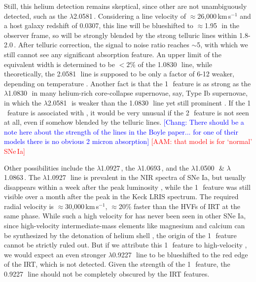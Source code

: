 \documentclass[twocolumn]{aastex631}
\newcommand{\adam}[1]{\textcolor{red}{[AAM: #1]}}
\newcommand{\chang}[1]{\textcolor{blue}{[Chang: #1]}}
\begin{document}
Still, this helium detection remains skeptical, since other  are not unambiguously detected, such as the  $\lambda$2.0581\,\micron. Considering a line velocity of $\approx$26,000\,km\,s$^{-1}$ and a host galaxy redshift of 0.0307, this line will be blueshifted to $\approx$1.95\,\micron\ in the observer frame, so will be strongly blended by the strong telluric lines within 1.8-2.0\,\micron. After telluric correction, the signal to noise ratio reaches $\sim$5, with which we still cannot see any significant absorption feature. An upper limit of the equivalent width is determined to be $<2\%$ of the 1.0830\,\micron\ line, while theoretically, the 2.0581\,\micron\ line is supposed to be only a factor of 6-12 weaker, depending on temperature \citep{Marion2009_NIR}. Another fact is that the 1\,\micron\ feature is as strong as the  $\lambda$1.0830\,\micron\ in many helium-rich core-collapse supernovae, say, Type Ib supernovae, in which the  $\lambda$2.0581\,\micron\ is weaker than the 1.0830\,\micron\ line yet still prominent \citep{CSP_Ibc_2022}. If the 1\,\micron\ feature is associated with , it would be very unusual if the 2\,\micron\ feature is not seen at all, even if somehow blended by the telluric lines. \chang{There should be a note here about the strength of the lines in the Boyle paper... for one of their models there is no obvious 2 micron absorption} \adam{that model is for `normal' SNe\,Ia}

Other possibilities include the  $\lambda$1.0927\,\micron, the  $\lambda$1.0693\,\micron, and the  $\lambda$1.0500\,\micron\ \& $\lambda$1.0863\,\micron. The  $\lambda$1.0927\,\micron\ line is prevalent in the NIR spectra of SNe Ia, but usually disappears within a week after the peak luminosity \citep{Marion2009_NIR}, while the 1\,\micron\ feature was still visible over a month after the peak in the Keck LRIS spectrum. The required radial velocity is $\approx$30,000\,km\,s$^{-1}$, $\approx$20\% faster than the HVFs of  IRT at the same phase. While such a high velocity for  has never been seen in other SNe Ia, since high-velocity intermediate-mass elements like magnesium and calcium can be synthesized by the detonation of helium shell \citep{Shen_DD_2014}, the  origin of the 1\,\micron\ feature cannot be strictly ruled out. But if we attribute this 1\,\micron\ feature to high-velocity , we would expect an even stronger $\lambda$0.9227\,\micron\ line to be blueshifted to the red edge of the  IRT, which is not detected. Given the strength of the 1\,\micron\ feature, the 0.9227\,\micron\ line should not be completely obscured by the  IRT features. 
\end{document}

